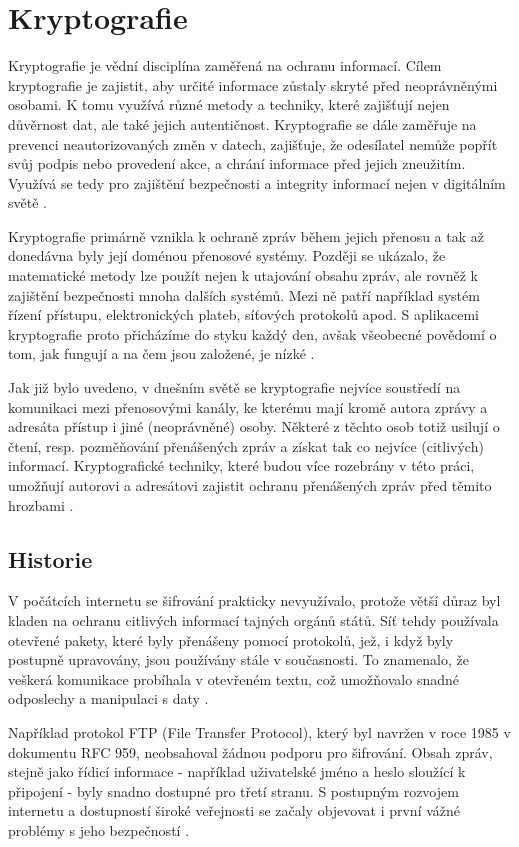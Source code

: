 \section{Kryptografie}
Kryptografie je vědní disciplína zaměřená na ochranu informací. Cílem kryptografie je zajistit, aby určité informace zůstaly skryté před neoprávněnými osobami. K tomu využívá různé metody a techniky, které zajišťují nejen důvěrnost dat, ale také jejich autentičnost. Kryptografie se dále zaměřuje na prevenci neautorizovaných změn v datech, zajišťuje, že odesílatel nemůže popřít svůj podpis nebo provedení akce, a chrání informace před jejich zneužitím. Využívá se tedy pro zajištění bezpečnosti a integrity informací nejen v digitálním světě \parencite{tesar2021}.

Kryptografie primárně vznikla k ochraně zpráv během jejich přenosu a tak až donedávna byly její doménou přenosové systémy. Později se ukázalo, že matematické metody lze použít nejen k utajování obsahu zpráv, ale rovněž k zajištění bezpečnosti mnoha dalších systémů. Mezi ně patří například systém řízení přístupu, elektronických plateb, síťových protokolů apod. S aplikacemi kryptografie proto přicházíme do styku každý den, avšak všeobecné povědomí o tom, jak fungují a na čem jsou založené, je nízké \parencite{burda2019}.

Jak již bylo uvedeno, v dnešním světě se kryptografie nejvíce soustředí na komunikaci mezi přenosovými kanály, ke kterému mají kromě autora zprávy a adresáta přístup i jiné (neoprávněné) osoby. Některé z těchto osob totiž usilují o čtení, resp. pozměňování přenášených zpráv a získat tak co nejvíce (citlivých) informací. Kryptografické techniky, které budou více rozebrány v této práci, umožňují autorovi a adresátovi zajistit ochranu přenášených zpráv před těmito hrozbami \parencite{sedlak2021}.

\subsection{Historie}

V počátcích internetu se šifrování prakticky nevyužívalo, protože větší důraz byl kladen na ochranu citlivých informací tajných orgánů států. Síť tehdy používala otevřené pakety, které byly přenášeny pomocí protokolů, jež, i když byly postupně upravovány, jsou používány stále v současnosti. To znamenalo, že veškerá komunikace probíhala v otevřeném textu, což umožňovalo snadné odposlechy a manipulaci s daty \parencite{erben2014}.

Například protokol FTP (File Transfer Protocol), který byl navržen v roce 1985 v dokumentu RFC 959, neobsahoval žádnou podporu pro šifrování. Obsah zpráv, stejně jako řídicí informace - například uživatelské jméno a heslo sloužící k připojení - byly snadno dostupné pro třetí stranu. S postupným rozvojem internetu a dostupností široké veřejnosti se začaly objevovat i první vážné problémy s jeho bezpečností \parencite{cerna2012}.

